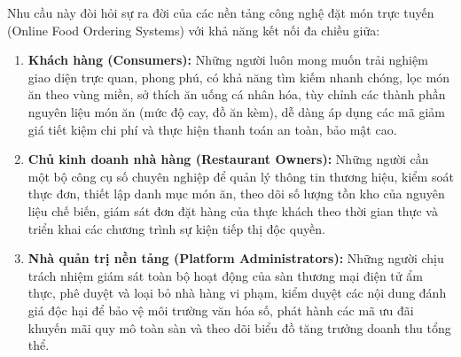 \documentclass{uetgraduation}
\begin{document}
Nhu cầu này đòi hỏi sự ra đời của các nền tảng công nghệ đặt món trực tuyến (Online Food Ordering Systems) với khả năng kết nối đa chiều giữa:
\begin{enumerate}
    \item \textbf{Khách hàng (Consumers):} Những người luôn mong muốn trải nghiệm giao diện trực quan, phong phú, có khả năng tìm kiếm nhanh chóng, lọc món ăn theo vùng miền, sở thích ăn uống cá nhân hóa, tùy chỉnh các thành phần nguyên liệu món ăn (mức độ cay, đồ ăn kèm), dễ dàng áp dụng các mã giảm giá tiết kiệm chi phí và thực hiện thanh toán an toàn, bảo mật cao.
    \item \textbf{Chủ kinh doanh nhà hàng (Restaurant Owners):} Những người cần một bộ công cụ số chuyên nghiệp để quản lý thông tin thương hiệu, kiểm soát thực đơn, thiết lập danh mục món ăn, theo dõi số lượng tồn kho của nguyên liệu chế biến, giám sát đơn đặt hàng của thực khách theo thời gian thực và triển khai các chương trình sự kiện tiếp thị độc quyền.
    \item \textbf{Nhà quản trị nền tảng (Platform Administrators):} Những người chịu trách nhiệm giám sát toàn bộ hoạt động của sàn thương mại điện tử ẩm thực, phê duyệt và loại bỏ nhà hàng vi phạm, kiểm duyệt các nội dung đánh giá độc hại để bảo vệ môi trường văn hóa số, phát hành các mã ưu đãi khuyến mãi quy mô toàn sàn và theo dõi biểu đồ tăng trưởng doanh thu tổng thể.
\end{enumerate}
\end{document}
